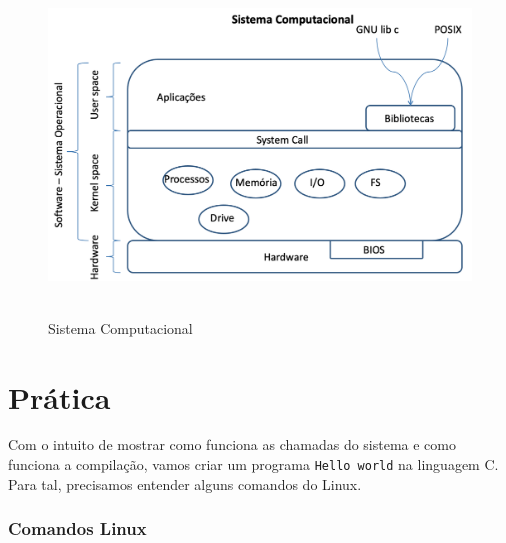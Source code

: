 \begin{figure}[h]
\centering
\includegraphics[keepaspectratio, width=12cm, height=9cm]{imagens/02/02 - funcionamento do computador.png}
\caption{Sistema Computacional}
\label{fig:sistema computacional}
\end{figure}



\hypertarget{Prática}{%
\section{Prática}\label{Prática}}

Com o intuito de mostrar como funciona as chamadas do sistema e como
funciona a compilação, vamos criar um programa \texttt{Hello\ world} na
linguagem C. Para tal, precisamos entender alguns comandos do Linux.

\hypertarget{comandos-linux}{%
\subsubsection{Comandos Linux}\label{comandos-linux}}

